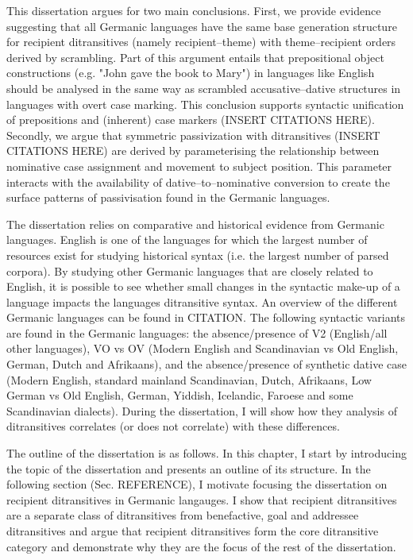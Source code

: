 \documentclass[11pt]{upenndiss}
\begin{document}
This dissertation argues for two main conclusions. First, we provide evidence suggesting that all Germanic languages have the same base generation structure for recipient ditransitives (namely recipient--theme) with theme--recipient orders derived by scrambling. Part of this argument entails that prepositional object constructions (e.g. "John gave the book to Mary") in languages like English should be analysed in the same way as scrambled accusative--dative structures in languages with overt case marking. This conclusion supports syntactic unification of prepositions and (inherent) case markers (INSERT CITATIONS HERE). Secondly, we argue that symmetric passivization with ditransitives (INSERT CITATIONS HERE) are derived by parameterising the relationship between nominative case assignment and movement to subject position. This parameter interacts with the availability of dative--to--nominative conversion to create the surface patterns of passivisation found in the Germanic languages.

The dissertation relies on comparative and historical evidence from Germanic languages. English is one of the languages for which the largest number of resources exist for studying historical syntax (i.e. the largest number of parsed corpora). By studying other Germanic languages that are closely related to English, it is possible to see whether small changes in the syntactic make-up of a language impacts the languages ditransitive syntax. An overview of the different Germanic languages can be found in CITATION. The following syntactic variants are found in the Germanic languages: the absence/presence of V2 (English/all other languages), VO vs OV (Modern English and Scandinavian vs Old English, German, Dutch and Afrikaans), and the absence/presence of synthetic dative case (Modern English, standard mainland Scandinavian, Dutch, Afrikaans, Low German vs Old English, German, Yiddish, Icelandic, Faroese and some Scandinavian dialects). During the dissertation, I will show how they analysis of ditransitives correlates (or does not correlate) with these differences. 

The outline of the dissertation is as follows. In this chapter, I start by introducing the topic of the dissertation and presents an outline of its structure. In the following section (Sec. REFERENCE), I motivate focusing the dissertation on recipient ditransitives in Germanic langauges. I show that recipient ditransitives are a separate class of ditransitives from benefactive, goal and addressee ditransitives and argue that recipient ditransitives form the core ditransitive category and demonstrate why they are the focus of the rest of the dissertation.
\end{document}
